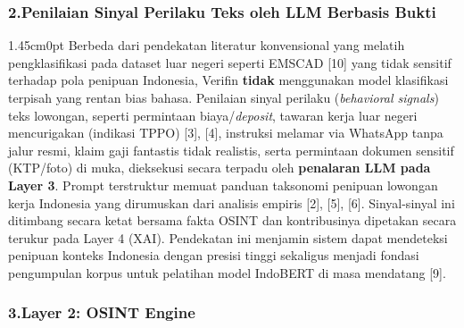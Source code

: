 \documentclass[12pt,a4paper]{article}
\begin{document}
\subsubsection*{2.\quad Penilaian Sinyal Perilaku Teks oleh LLM Berbasis Bukti}
{}

\begin{adjustwidth}{1.45cm}{0pt}
\hspace*{0.85cm}Berbeda dari pendekatan literatur konvensional yang melatih pengklasifikasi pada dataset
luar negeri seperti EMSCAD [10] yang tidak sensitif terhadap pola penipuan Indonesia, Verifin
\textbf{tidak} menggunakan model klasifikasi terpisah yang rentan bias bahasa. Penilaian sinyal perilaku
(\textit{behavioral signals}) teks lowongan, seperti permintaan biaya/\textit{deposit},
tawaran kerja luar negeri mencurigakan (indikasi TPPO) [3], [4], instruksi melamar via WhatsApp tanpa jalur resmi,
klaim gaji fantastis tidak realistis, serta permintaan dokumen sensitif (KTP/foto) di muka, dieksekusi secara terpadu oleh
\textbf{penalaran LLM pada Layer 3}. Prompt terstruktur memuat panduan taksonomi penipuan lowongan kerja
Indonesia yang dirumuskan dari analisis empiris [2], [5], [6]. Sinyal-sinyal ini ditimbang secara ketat bersama
fakta OSINT dan kontribusinya dipetakan secara terukur pada Layer 4 (XAI). Pendekatan ini menjamin sistem
dapat mendeteksi penipuan konteks Indonesia dengan presisi tinggi sekaligus menjadi fondasi pengumpulan
korpus untuk pelatihan model IndoBERT di masa mendatang [9].
\end{adjustwidth}

\subsubsection*{3.\quad Layer 2: OSINT Engine}
\end{document}

